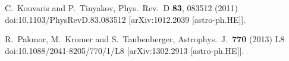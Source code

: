   C.~Kouvaris and P.~Tinyakov,
  Phys.\ Rev.\ D {\bf 83}, 083512 (2011)
  doi:10.1103/PhysRevD.83.083512
  [arXiv:1012.2039 [astro-ph.HE]].

  R.~Pakmor, M.~Kromer and S.~Taubenberger,
  Astrophys.\ J.\  {\bf 770} (2013) L8
  doi:10.1088/2041-8205/770/1/L8
  [arXiv:1302.2913 [astro-ph.HE]].


